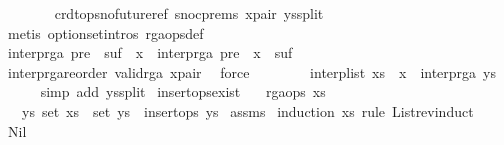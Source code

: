 \begin{isabellebody}
\ \ \ \ \ \ \isamarkupfalse%
\ crdt{\isacharunderscore}ops{\isacharunderscore}no{\isacharunderscore}future{\isacharunderscore}ref\ snoc{\isachardot}prems{\isacharparenleft}{}{\isacharparenright}\ x{\isacharunderscore}pair\ ys{\isacharunderscore}split\isanewline
\ \ \ \ \ \ \isamarkupfalse%
\ {\isacharparenleft}metis\ option{\isachardot}set{\isacharunderscore}intros\ rga{\isacharunderscore}ops{\isacharunderscore}def{\isacharparenright}\isanewline
\ \ \ \ \isamarkupfalse%
\ \isamarkupfalse%
\ {\isachardoublequoteopen}interp{\isacharunderscore}rga\ {\isacharparenleft}pre\ {\isacharat}\ suf\ {\isacharat}\ {\isacharbrackleft}x{\isacharbrackright}{\isacharparenright}\ {\isacharequal}\ interp{\isacharunderscore}rga\ {\isacharparenleft}pre\ {\isacharat}\ {\isacharbrackleft}x{\isacharbrackright}\ {\isacharat}\ suf{\isacharparenright}{\isachardoublequoteclose}\isanewline
\ \ \ \ \ \ \isamarkupfalse%
\ interp{\isacharunderscore}rga{\isacharunderscore}reorder\ valid{\isacharunderscore}rga\ x{\isacharunderscore}pair\ \isamarkupfalse%
\ force\isanewline
\ \ \isamarkupfalse%
\isanewline
\ \ \isamarkupfalse%
\ \isamarkupfalse%
\ {\isachardoublequoteopen}interp{\isacharunderscore}list\ {\isacharparenleft}xs\ {\isacharat}\ {\isacharbrackleft}x{\isacharbrackright}{\isacharparenright}\ {\isacharequal}\ interp{\isacharunderscore}rga\ ys{\isachardoublequoteclose}\isanewline
\ \ \ \ \isamarkupfalse%
\ {\isacharparenleft}simp\ add{\isacharcolon}\ ys{\isacharunderscore}split{\isacharparenright}\isanewline
{}\isamarkupfalse%
%
\endisatagproof
{\isafoldproof}%
%
\isadelimproof
\isanewline
%
\endisadelimproof
\isanewline
{}\isamarkupfalse%
\ insert{\isacharunderscore}ops{\isacharunderscore}exist{\isacharcolon}\isanewline
\ \ \ {\isachardoublequoteopen}rga{\isacharunderscore}ops\ xs{\isachardoublequoteclose}\isanewline
\ \ \ {\isachardoublequoteopen}{\isasymexists}ys{\isachardot}\ set\ xs\ {\isacharequal}\ set\ ys\ {\isasymand}\ insert{\isacharunderscore}ops\ ys{\isachardoublequoteclose}\isanewline
%
\isadelimproof
%
\endisadelimproof
%
\isatagproof
{}\isamarkupfalse%
\ assms\ \isamarkupfalse%
{\isacharparenleft}induction\ xs\ rule{\isacharcolon}\ List{\isachardot}rev{\isacharunderscore}induct{\isacharparenright}\isanewline
\ \ \isamarkupfalse%
\ Nil\isanewline
\ \ \isamarkupfalse%

\end{isabellebody}
